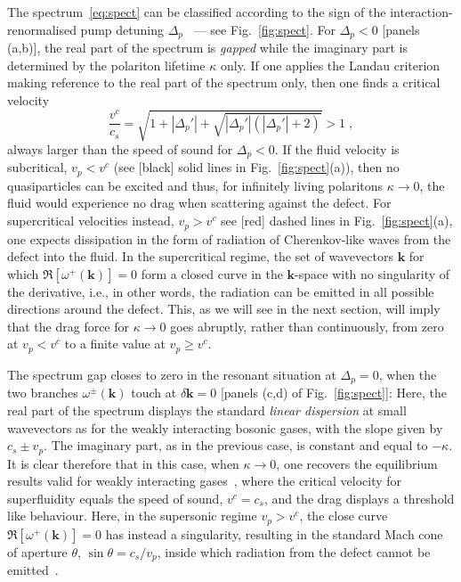 
The spectrum~\eqref{eq:spect} can be classified according to the sign
of the interaction-renormalised pump detuning
$\Delta_p$~\cite{Carusotto_2004,Ciuti_2005} --- see
Fig.~\ref{fig:spect}. For $\Delta_p<0$ [panels (a,b)], the real part
of the spectrum is \emph{gapped} while the imaginary part is
determined by the polariton lifetime $\kappa$ only. If one applies the
Landau criterion making reference to the real part of the spectrum
only, then one finds a critical velocity
%
\begin{equation}
  \frac{v^c}{c_s} = \sqrt{1 + |\Delta_p'| +
    \sqrt{|\Delta_p'|(|\Delta_p'| + 2)}} > 1\; ,
\label{eq:criti}
\end{equation}
%
always larger than the speed of sound for $\Delta_p<0$. If the fluid
velocity is subcritical, $v_p<v^c$ (see [black] solid lines in
Fig.~\ref{fig:spect}(a)), then no quasiparticles can be excited and
thus, for infinitely living polaritons $\kappa \to 0$, the fluid would
experience no drag when scattering against the defect. For
supercritical velocities instead, $v_p>v^c$ see [red] dashed lines in
Fig.~\ref{fig:spect}(a), one expects dissipation in the form of
radiation of Cherenkov-like waves from the defect into the fluid. In
the supercritical regime, the set of wavevectors $\bm{k}$ for which
$\Re[\omega^{+} (\bm{k})] = 0$ form a closed curve in the
$\bm{k}$-space with no singularity of the derivative, i.e., in other
words, the radiation can be emitted in all possible directions around
the defect. This, as we will see in the next section, will imply that
the drag force for $\kappa \to 0$ goes abruptly, rather than
continuously, from zero at $v_p<v^c$ to a finite value at $v_p \ge
v^c$.


The spectrum gap closes to zero in the resonant situation at
$\Delta_p=0$, when the two branches $\omega^{\pm} (\bm{k})$ touch at
$\delta \bm{k}=0$ [panels (c,d) of Fig.~\ref{fig:spect}]: Here, the
real part of the spectrum displays the standard \emph{linear
  dispersion} at small wavevectors as for the weakly interacting
bosonic gases, with the slope given by $c_s \pm v_p$. The imaginary
part, as in the previous case, is constant and equal to $-\kappa$. It
is clear therefore that in this case, when $\kappa \to 0$, one
recovers the equilibrium results valid for weakly interacting
gases~\cite{Astrakharchik_2004,Carusotto_2006}, where the critical
velocity for superfluidity equals the speed of sound, $v^c=c_s$, and
the drag displays a threshold like behaviour. Here, in the supersonic
regime $v_p> v^c$, the close curve $\Re[ \omega^{+} (\bm{k})] = 0$
has instead a singularity, resulting in the standard Mach cone of
aperture $\theta$, $\sin \theta = c_s/v_p$, inside which radiation
from the defect cannot be emitted~\cite{Carusotto_2006}.

